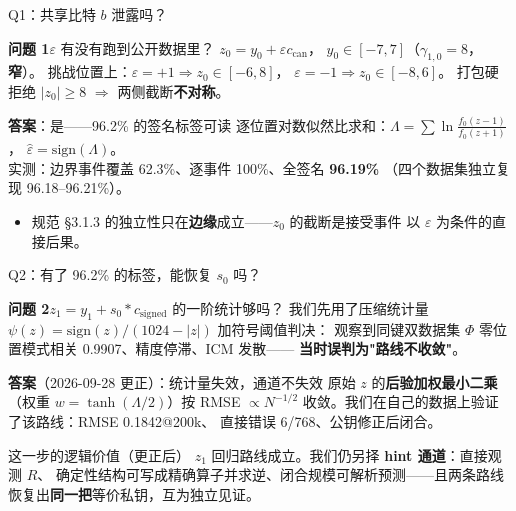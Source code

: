 \documentclass[11pt,aspectratio=169]{ctexbeamer}
\begin{document}
\begin{frame}{Q1：共享比特 $b$ 泄露吗？}
  \begin{block}{\textbf{问题 1}\quad $\varepsilon$ 有没有跑到公开数据里？}
    \small $z_0 = y_0 + \varepsilon c_{\mathrm{can}}$，
    $y_0\in[-7,7]$（$\gamma_{1,0}=8$，\textbf{窄}）。
    挑战位置上：$\varepsilon=+1 \Rightarrow z_0\in[-6,8]$，
    $\varepsilon=-1 \Rightarrow z_0\in[-8,6]$。
    打包硬拒绝 $|z_0|\ge8$ $\Rightarrow$ 两侧截断\textbf{不对称}。
  \end{block}
  \begin{exampleblock}{\textbf{答案}：是——96.2\% 的签名标签可读}
    \small 逐位置对数似然比求和：$\Lambda=\sum\ln\frac{f_0(z-1)}{f_0(z+1)}$，
    $\hat\varepsilon=\mathrm{sign}(\Lambda)$。\\
    实测：边界事件覆盖 62.3\%、逐事件 100\%、全签名 \textbf{96.19\%}
    （四个数据集独立复现 96.18--96.21\%）。
  \end{exampleblock}
  \begin{itemize}
    \item 规范 §3.1.3 的独立性只在\textbf{边缘}成立——$z_0$ 的截断是接受事件
          以 $\varepsilon$ 为条件的直接后果。
  \end{itemize}
\end{frame}

\begin{frame}{Q2：有了 96.2\% 的标签，能恢复 $s_0$ 吗？}
  \begin{block}{\textbf{问题 2}\quad $z_1 = y_1 + s_0*c_{\mathrm{signed}}$ 的一阶统计够吗？}
    \small 我们先用了压缩统计量 $\psi(z)=\mathrm{sign}(z)/(1024-|z|)$ 加符号阈值判决：
    观察到同键双数据集 $\Phi$ 零位置模式相关 0.9907、精度停滞、ICM 发散——
    \textbf{当时误判为"路线不收敛"}。
  \end{block}
  \begin{exampleblock}{\textbf{答案}（2026-09-28 更正）：统计量失效，通道不失效}
    \small 原始 $z$ 的\textbf{后验加权最小二乘}（权重 $w=\tanh(\Lambda/2)$）按
    RMSE $\propto N^{-1/2}$ 收敛。我们在自己的数据上验证了该路线：RMSE 0.1842@200k、
    直接错误 6/768、公钥修正后闭合。
  \end{exampleblock}
  \begin{block}{这一步的逻辑价值（更正后）}
    \small $z_1$ 回归路线成立。我们仍另择 \textbf{hint 通道}：直接观测 $R$、
    确定性结构可写成精确算子并求逆、闭合规模可解析预测——且两条路线
    恢复出\textbf{同一把}等价私钥，互为独立见证。
  \end{block}
\end{frame}
\end{document}
